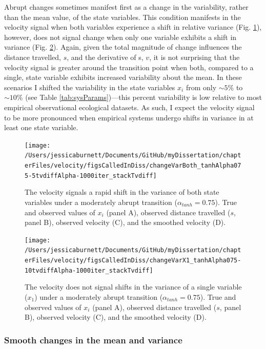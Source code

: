 \documentclass[12pt,twoside,openany]{reedthesis}
\begin{document}
Abrupt changes sometimes manifest first as a change in the variability, rather than the mean value, of the state variables. This condition manifests in the velocity signal when both variables experience a shift in relative variance (Fig. \ref{fig:varBoth}), however, does not signal change when only one variable exhibits a shift in variance (Fig. \ref{fig:var1}). Again, given the total magnitude of change influences the distance travelled, \(s\), and the derivative of s, \(v\), it is not surprising that the velocity signal is greater around the transition point when both, compared to a single, state variable exhibits increased variability about the mean. In these scenarios I shifted the variability in the state variables \(x_i\) from only \(\sim 5\%\) to \(\sim10\%\) (see Table \ref{tab:sysParams})---this percent variability is low relative to most empirical observational ecological datasets. As such, I expect the velocity signal to be more pronounced when empirical systems undergo shifts in variance in at least one state variable.
\begin{figure}
\texttt{[image: /Users/jessicaburnett/Documents/GitHub/myDissertation/chapterFiles/velocity/figsCalledInDiss/changeVarBoth\_tanhAlpha075-5tvdiffAlpha-1000iter\_stackTvdiff]} \caption{The velocity signals a rapid shift in the variance of both state variables under a moderately abrupt transition ($\alpha_{tanh}=0.75$). True and observed values of $x_i$ (panel A), observed distance travelled ($s$, panel B), observed velocity (C), and the smoothed velocity (D). }\label{fig:varBoth}
\end{figure}
\begin{figure}
\texttt{[image: /Users/jessicaburnett/Documents/GitHub/myDissertation/chapterFiles/velocity/figsCalledInDiss/changeVarX1\_tanhAlpha075-10tvdiffAlpha-1000iter\_stackTvdiff]} \caption{The velocity does not signal shifts in the variance of a single variable ($x_1$) under a moderately abrupt transition ($\alpha_{tanh}=0.75$). True and observed values of $x_i$ (panel A), observed distance travelled ($s$, panel B), observed velocity (C), and the smoothed velocity (D). }\label{fig:var1}
\end{figure}
\hypertarget{smooth-changes-in-the-mean-and-variance}{%
\subsubsection{Smooth changes in the mean and variance}\label{smooth-changes-in-the-mean-and-variance}}
\end{document}

